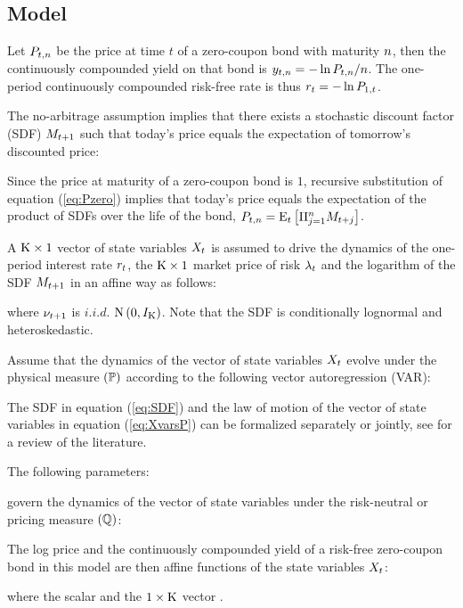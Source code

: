 \subsection{Model} \label{sec:ATSM_eqns}
Let $P_{t,n}$ be the price at time $t$ of a zero-coupon bond with maturity $n$, then the continuously compounded yield on that bond is $y_{t,n} = - \ln P_{t,n}/n $. The one-period continuously compounded risk-free rate is thus $r_{t} = - \ln P_{1,t}$.

The no-arbitrage assumption implies that there exists a stochastic discount factor (SDF) $M_{t+1}$ such that today's price equals the expectation of tomorrow's discounted price:
	
Since the price at maturity of a zero-coupon bond is $1$, recursive substitution of equation (\ref{eq:Pzero}) implies that today's price equals the expectation of the product of SDFs over the life of the bond, $P_{t,n} = \mathrm{E}_{t} \left[\Pi_{j=1} ^n M_{t+j}\right]$.

A $\mathrm{K} \times 1$ vector of state variables $X_{t}$ is assumed to drive the dynamics of the one-period interest rate $r_{t}$, the $\mathrm{K} \times 1$ market price of risk $\lambda_{t}$ and the logarithm of the SDF $M_{t+1}$ in an affine way as follows:
	
	
	

where $\nu_{t+1}$ is $i.i.d.$ $\mathrm{N} \left(0,I_{\mathrm{K}}\right)$. Note that the SDF is conditionally lognormal and heteroskedastic.

Assume that the dynamics of the vector of state variables $X_{t}$ evolve under the physical measure $(\mathbb{P})$ according to the following vector autoregression (VAR):
	

The SDF in equation (\ref{eq:SDF}) and the law of motion of the vector of state variables in equation (\ref{eq:XvarsP}) can be formalized separately or jointly, see \cite{GurkaynakWright:2012} for a review of the literature.

The following parameters:
	
	

govern the dynamics of the vector of state variables under the risk-neutral or pricing measure $(\mathbb{Q})$:
	

The log price and the continuously compounded yield of a risk-free zero-coupon bond in this model are then affine functions of the state variables $X_{t}$:
	
	
where the scalar  and the $1 \times \mathrm{K}$ vector .

